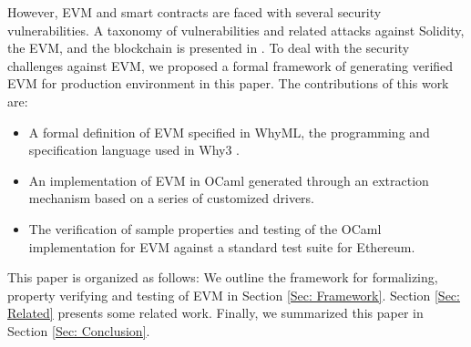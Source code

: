 \documentclass[runningheads]{llncs}
\begin{document}
However, EVM and smart contracts are faced with several security vulnerabilities. %
A taxonomy of vulnerabilities and related attacks against Solidity, the EVM, and the blockchain is presented in \cite{atzei2016survey}. 
To deal with the security challenges against EVM, we proposed a formal framework of generating verified EVM for production environment in this paper. The contributions of this work are: 
\begin{itemize}
\item A formal definition of EVM specified in WhyML, the programming and specification language used in Why3 \cite{filliatre2013why3}. 
\item An implementation of EVM in OCaml generated through an extraction mechanism based on a series of customized drivers. 
\item The verification of sample properties and testing of the OCaml implementation for EVM against a standard test suite for Ethereum.
\end{itemize}

This paper is organized as follows: %
We outline the framework for formalizing, property verifying and testing of EVM in Section \ref{Sec: Framework}. %
Section \ref{Sec: Related} presents some related work. Finally, we summarized this paper %
in Section \ref{Sec: Conclusion}.
\end{document}
